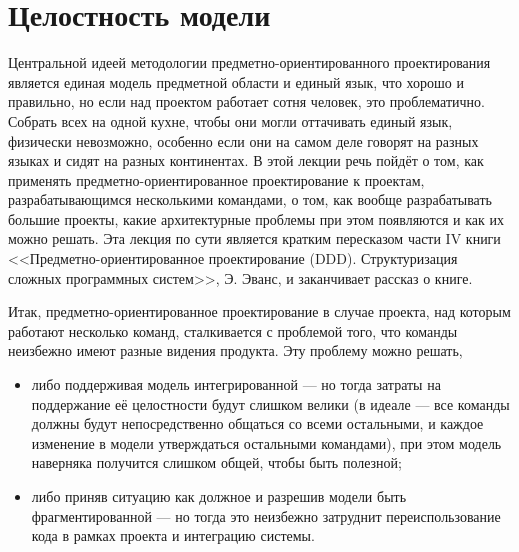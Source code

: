 \documentclass{../../text-style}
\begin{document}
\maketitle
\thispagestyle{empty}

\section{Целостность модели}

Центральной идеей методологии предметно-ориентированного проектирования является единая модель предметной области и единый язык, что хорошо и правильно, но если над проектом работает сотня человек, это проблематично. Собрать всех на одной кухне, чтобы они могли оттачивать единый язык, физически невозможно, особенно если они на самом деле говорят на разных языках и сидят на разных континентах. В этой лекции речь пойдёт о том, как применять предметно-ориентированное проектирование к проектам, разрабатывающимся несколькими командами, о том, как вообще разрабатывать большие проекты, какие архитектурные проблемы при этом появляются и как их можно решать. Эта лекция по сути является кратким пересказом части IV книги <<Предметно-ориентированное проектирование (DDD). Структуризация сложных программных систем>>, Э. Эванс, и заканчивает рассказ о книге.

Итак, предметно-ориентированное проектирование в случае проекта, над которым работают несколько команд, сталкивается с проблемой того, что команды неизбежно имеют разные видения продукта. Эту проблему можно решать, 

\begin{itemize}
    \item либо поддерживая модель интегрированной --- но тогда затраты на поддержание её целостности будут слишком велики (в идеале --- все команды должны будут непосредственно общаться со всеми остальными, и каждое изменение в модели утверждаться остальными командами), при этом модель наверняка получится слишком общей, чтобы быть полезной;
    \item либо приняв ситуацию как должное и разрешив модели быть фрагментированной --- но тогда это неизбежно затруднит переиспользование кода в рамках проекта и интеграцию системы.
\end{itemize}
\end{document}
